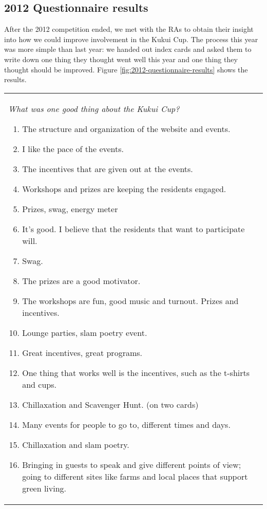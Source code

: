 \documentclass[]{IEEEconf}
\begin{document}
\subsection{2012 Questionnaire results}

After the 2012 competition ended, we met with the RAs to obtain their insight into how we could
improve involvement in the Kukui Cup.   The process this year was more simple than last year: we handed
out index cards and asked them to write down one thing they thought went well this year
and one thing they thought should be improved.   Figure \ref{fig:2012-questionnaire-results} shows
the results. 


\begin{figure*}[th!]
\begin{tabular}{|l|l|}
\hline

\small  \begin{minipage}[t]{2.6in}
{\em What was one good thing about the Kukui Cup?}
\begin{enumerate}
\item The structure and organization of the website and events.
\item I like the pace of the events.
\item The incentives that are given out at the events. 
\item Workshops and prizes are keeping the residents engaged.
\item Prizes, swag, energy meter
\item It's good. I believe that the residents that want to participate will.
\item Swag.
\item The prizes are a good motivator. 
\item The workshops are fun, good music and turnout. Prizes and incentives.
\item 	Lounge parties, slam poetry event.
\item 	Great incentives, great programs.
\item 	One thing that works well is the incentives, such as the t-shirts and cups.
\item 	Chillaxation and Scavenger Hunt. (on two cards)
\item 	Many events for people to go to, different times and days.
\item 	Chillaxation and slam poetry.
\item 	Bringing in guests to speak and give different points of view; going to different sites like farms and local places that support green living.

\end{enumerate}
\end{minipage}
\end{tabular}
\end{figure*}
\end{document}
